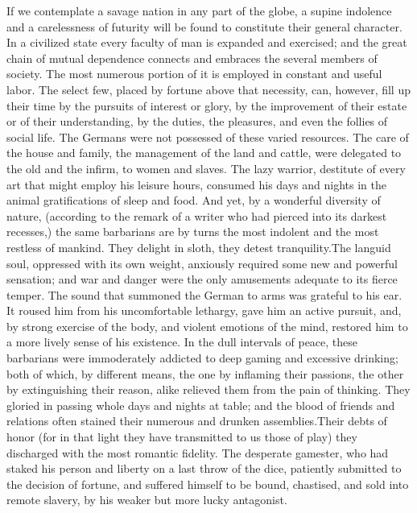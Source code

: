 If we contemplate a savage nation in any part of the globe, a
supine indolence and a carelessness of futurity will be found to
constitute their general character. In a civilized state every
faculty of man is expanded and exercised; and the great chain of
mutual dependence connects and embraces the several members of
society. The most numerous portion of it is employed in constant
and useful labor. The select few, placed by fortune above that
necessity, can, however, fill up their time by the pursuits of
interest or glory, by the improvement of their estate or of their
understanding, by the duties, the pleasures, and even the follies
of social life. The Germans were not possessed of these varied
resources. The care of the house and family, the management of
the land and cattle, were delegated to the old and the infirm, to
women and slaves. The lazy warrior, destitute of every art that
might employ his leisure hours, consumed his days and nights in
the animal gratifications of sleep and food. And yet, by a
wonderful diversity of nature, (according to the remark of a
writer who had pierced into its darkest recesses,) the same
barbarians are by turns the most indolent and the most restless
of mankind. They delight in sloth, they detest tranquility.\footnotemark[30]
The languid soul, oppressed with its own weight, anxiously
required some new and powerful sensation; and war and danger were
the only amusements adequate to its fierce temper. The sound that
summoned the German to arms was grateful to his ear. It roused
him from his uncomfortable lethargy, gave him an active pursuit,
and, by strong exercise of the body, and violent emotions of the
mind, restored him to a more lively sense of his existence. In
the dull intervals of peace, these barbarians were immoderately
addicted to deep gaming and excessive drinking; both of which, by
different means, the one by inflaming their passions, the other
by extinguishing their reason, alike relieved them from the pain
of thinking. They gloried in passing whole days and nights at
table; and the blood of friends and relations often stained their
numerous and drunken assemblies.\footnotemark[31] Their debts of honor (for in
that light they have transmitted to us those of play) they
discharged with the most romantic fidelity. The desperate
gamester, who had staked his person and liberty on a last throw
of the dice, patiently submitted to the decision of fortune, and
suffered himself to be bound, chastised, and sold into remote
slavery, by his weaker but more lucky antagonist.\footnotemark[32]

